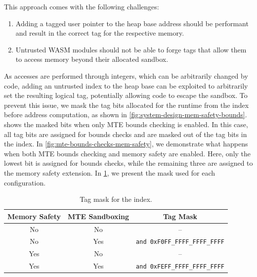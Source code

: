 \noindent
This approach comes with the following challenges:
\begin{enumerate}
    \item Adding a tagged user pointer to the heap base address should be performant and result in the correct tag for the respective memory.
    \item Untrusted \ac{WASM} modules should not be able to forge tags that allow them to access memory beyond their allocated sandbox.
\end{enumerate}

\noindent
As accesses are performed through integers, which can be arbitrarily changed by code, adding an untrusted index to the heap base can be exploited to arbitrarily set the resulting logical tag, potentially allowing code to escape the sandbox.
To prevent this issue, we mask the tag bits allocated for the runtime from the index before address computation, as shown in \cref{fig:system-design-mem-safety-bounds}.
 shows the masked bits when only \ac{MTE} bounds checking is enabled.
In this case, all tag bits are assigned for bounds checks and are masked out of the tag bits in the index.
In \cref{fig:mte-bounds-checks-mem-safety}, we demonstrate what happens when both \ac{MTE} bounds checking and memory safety are enabled.
Here, only the lowest bit is assigned for bounds checks, while the remaining three are assigned to the memory safety extension.
In \cref{tab:tag-mask}, we present the mask used for each configuration.

\begin{table}
    \centering
    \caption{Tag mask for the index.}
    \label{tab:tag-mask}
    \begin{tabular}{c | c || c}
        \textbf{Memory Safety} & \textbf{MTE Sandboxing} & \textbf{Tag Mask}                     \\
        \hline
        No                     & No                      & --                                    \\
        No                     & Yes                     & \texttt{and 0xF0FF\_FFFF\_FFFF\_FFFF} \\
        Yes                    & No                      & --                                    \\
        Yes                    & Yes                     & \texttt{and 0xFEFF\_FFFF\_FFFF\_FFFF}
    \end{tabular}
\end{table}

